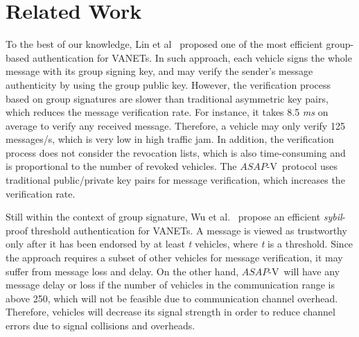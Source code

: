 \documentclass[preprint,12pt]{elsarticle}
\newcommand{\protocolname}{$ASAP$-V}
\begin{document}
\section{Related Work}
\label{sec:related}

To the best of our knowledge, Lin et al~\cite{lin2007gsis} proposed one of the most efficient group-based authentication for VANETs. In such approach, each vehicle signs the whole message with its group signing key, and may verify the sender's message authenticity by using the group public key. However, the verification process based on group signatures are slower than traditional asymmetric key pairs, which reduces the message verification rate. For instance, it takes 8.5 \textit{ms} on average to verify any received message. Therefore, a vehicle may only verify 125 messages/s, which is very low in high traffic jam. In addition, the verification process does not consider the revocation lists, which is also time-consuming and is proportional to the number of revoked vehicles.  The \protocolname~protocol uses traditional public/private key pairs for message verification, which increases the verification rate.

Still within the context of group signature, Wu et al.~\cite{wu2010balanced} propose an efficient \textit{sybil}-proof threshold authentication for VANETs. A message is viewed as trustworthy only after it has been endorsed by at least \textit{t} vehicles, where \textit{t} is a threshold. Since the approach requires a subset of other vehicles for message verification, it may suffer from message loss and delay. On the other hand, \protocolname~will have any message delay or loss if the number of vehicles in the communication range is above 250, which will not be feasible due to communication channel overhead. Therefore, vehicles will decrease its signal strength in order to reduce channel errors due to signal collisions and overheads.

%
\end{document}

